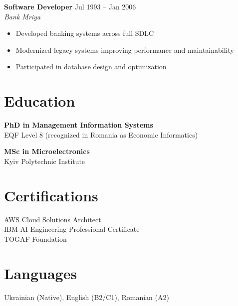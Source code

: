 \documentclass[10pt,a4paper]{article}
\begin{document}
\textbf{Software Developer} \hfill Jul 1993 -- Jan 2006 \\
\textit{Bank Mriya}

\begin{itemize}[leftmargin=*]
\item Developed banking systems across full SDLC
\item Modernized legacy systems improving performance and maintainability
\item Participated in database design and optimization
\end{itemize}

\section*{Education}

\textbf{PhD in Management Information Systems} \\
EQF Level 8 (recognized in Romania as Economic Informatics)

\textbf{MSc in Microelectronics} \\
Kyiv Polytechnic Institute

\section*{Certifications}

AWS Cloud Solutions Architect \\
IBM AI Engineering Professional Certificate \\
TOGAF Foundation

\section*{Languages}

Ukrainian (Native), English (B2/C1), Romanian (A2)
\end{document}
